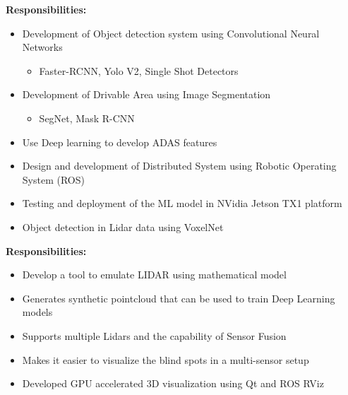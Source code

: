 \documentclass[10pt,a4paper,ragged2e,withhyper]{altacv}
\begin{document}

            \smallskip
            \textbf{Responsibilities:}\\
            \vspace{0.5em}
            \begin{itemize}
                \item Development of Object detection system using Convolutional Neural Networks
                    \begin{itemize}
                        \item Faster-RCNN, Yolo V2, Single Shot Detectors
                    \end{itemize}
                \item Development of Drivable Area using Image Segmentation
                    \begin{itemize}
                        \item SegNet, Mask R-CNN
                    \end{itemize}
                \item Use Deep learning to develop ADAS features
                \item Design and development of Distributed System using Robotic Operating System (ROS)
                \item Testing and deployment of the ML model in NVidia Jetson TX1 platform
                \item Object detection  in Lidar data using VoxelNet
            \end{itemize}
            \divider

            \smallskip
            \textbf{Responsibilities:}\\
            \vspace{0.5em}
            \begin{itemize}
                \item Develop a tool to emulate LIDAR using mathematical model
                \item Generates synthetic pointcloud that can be used to train Deep Learning models
                \item Supports multiple Lidars and the capability of Sensor Fusion
                \item Makes it easier to visualize the blind spots in a multi-sensor setup
                \item Developed GPU accelerated 3D visualization using Qt and ROS RViz
            \end{itemize}
            \divider
\end{document}
